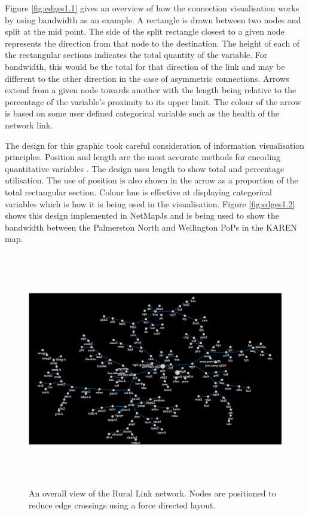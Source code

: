 \documentclass[11pt, a4paper]{article}
\begin{document}
Figure \ref{fig:edges1.1} gives an overview of how the connection visualisation
works by using bandwidth as an example. A rectangle is drawn between two nodes
and split at the mid point. The side of the split rectangle closest to a given
node represents the direction from that node to the destination. The height of
each of the rectangular sections indicates the total quantity of the variable.
For bandwidth, this would be the total for that direction of the link and may be
different to the other direction in the case of asymmetric connections. Arrows
extend from a given node towards another with the length being relative to the
percentage of the variable's proximity to its upper limit.  The colour of the
arrow is based on some user defined categorical variable such as the health of
the network link.

The design for this graphic took careful consideration of information
visualisation principles. Position and length are the most accurate methods for
encoding quantitative variables \cite{Spence_2007}. The design uses length to
show total and percentage utilisation. The use of position is also shown in the
arrow as a proportion of the total rectangular section. Colour hue is effective
at displaying categorical variables which is how it is being used in the
visualisation. Figure \ref{fig:edges1.2} shows this design implemented in
NetMapJs and is being used to show the bandwidth between the Palmerston North
and Wellington PoPs in the KAREN map.

\begin{figure}
\centering
\includegraphics[width=170mm,height=102.54mm]{assets/edges1-0.eps}
\caption{An overall view of the Rural Link network. Nodes are positioned to
reduce edge crossings using a force directed layout.}
\label{fig:edges1.0}
\end{figure}
\end{document}
